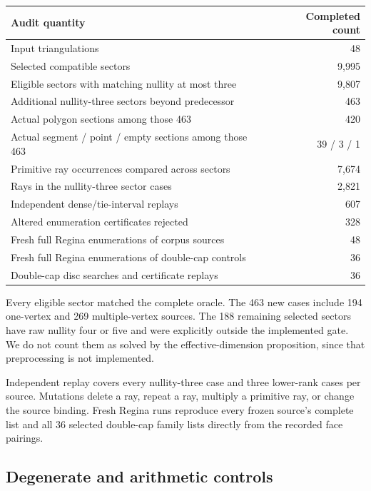 \documentclass[11pt,letterpaper]{article}
\theoremstyle{definition}
\theoremstyle{remark}\newtheorem{remark}[theorem]{Remark}
\begin{document}
\begin{center}
\begin{tabular}{@{}lr@{}}
\toprule
Audit quantity & Completed count \\
\midrule
Input triangulations & 48\\
Selected compatible sectors & 9,995\\
Eligible sectors with matching nullity at most three & 9,807\\
Additional nullity-three sectors beyond predecessor & 463\\
Actual polygon sections among those 463 & 420\\
Actual segment / point / empty sections among those 463 & 39 / 3 / 1\\
Primitive ray occurrences compared across sectors & 7,674\\
Rays in the nullity-three sector cases & 2,821\\
Independent dense/tie-interval replays & 607\\
Altered enumeration certificates rejected & 328\\
Fresh full Regina enumerations of corpus sources & 48\\
Fresh full Regina enumerations of double-cap controls & 36\\
Double-cap disc searches and certificate replays & 36\\
\bottomrule
\end{tabular}
\end{center}

Every eligible sector matched the complete oracle. The 463 new cases
include 194 one-vertex and 269 multiple-vertex sources. The 188 remaining
selected sectors have raw nullity four or five and were explicitly outside
the implemented gate. We do not count them as solved by the
effective-dimension proposition, since that preprocessing is not implemented.

Independent replay covers every nullity-three case and three lower-rank
cases per source. Mutations delete a ray, repeat a ray, multiply a
primitive ray, or change the source binding. Fresh Regina runs reproduce
every frozen source's complete list and all 36 selected double-cap family
lists directly from the recorded face pairings.

\subsection{Degenerate and arithmetic controls}
\end{document}

